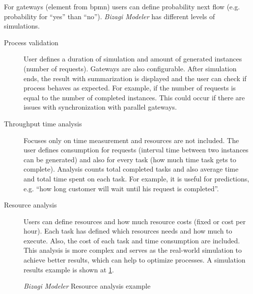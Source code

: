 For gateways (element from \gls{bpmn}) users can define probability next flow (e.g. probability for ``yes'' than ``no''). \textit{Bizagi Modeler} has different levels of simulations.
    \begin{description}
        \item[Process validation] User defines a duration of simulation and amount of generated instances (number of requests). Gateways are also configurable. After simulation ends, the result with summarization is displayed and the user can check if process behaves as expected. For example, if the number of requests is equal to the number of completed instances. This could occur if there are issues with synchronization with parallel gateways.
        \item[Throughput time analysis] Focuses only on time measurement and resources are not included. The user defines consumption for requests (interval time between two instances can be generated) and also for every task (how much time task gets to complete). Analysis counts total completed tasks and also average time and total time spent on each task. For example, it is useful for predictions, e.g. ``how long customer will wait until his request is completed''.
        \item[Resource analysis] Users can define resources and how much resource costs (fixed or cost per hour). Each task has defined which resources needs and how much to execute. Also, the cost of each task and time consumption are included. This analysis is more complex and serves as the real-world simulation to achieve better results, which can help to optimize processes. A simulation results example is shown at \cref{fig:bizagi-example}.
    \end{description}

\begin{figure}[ht!]
    \centering
    \qquad
    \caption{\textit{Bizagi Modeler} Resource analysis example\cite{bizagi-2018}}%
    \label{fig:bizagi-example}%
\end{figure}

